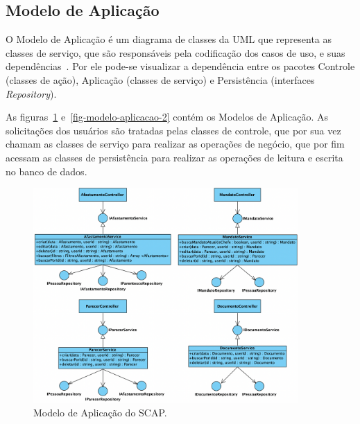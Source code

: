 \subsection{Modelo de Aplicação}
\label{subsec-frameweb-aplicacao}
O Modelo de Aplicação é um diagrama de classes da UML que representa as classes de
serviço, que são responsáveis pela codificação dos casos de uso, e suas dependências~\cite{souza:2007}.
Por ele pode-se visualizar a dependência entre os pacotes Controle (classes de ação),
Aplicação (classes de serviço) e Persistência (interfaces \textit{Repository}). 

As figuras~\ref{fig-modelo-aplicacao-1} e~\ref{fig-modelo-aplicacao-2} contém os Modelos de Aplicação.
As solicitações dos usuários são tratadas pelas classes de controle, que por sua vez
chamam as classes de serviço para realizar as operações de negócio, que por fim acessam
as classes de persistência para realizar as operações de leitura e escrita no banco de dados.


\begin{figure}[h!]
    \centering
    \includegraphics[width=0.9\textwidth]{figuras/fig-modelo-apl-1.png}
    \caption{Modelo de Aplicação do SCAP.}
    \label{fig-modelo-aplicacao-1}
\end{figure}


